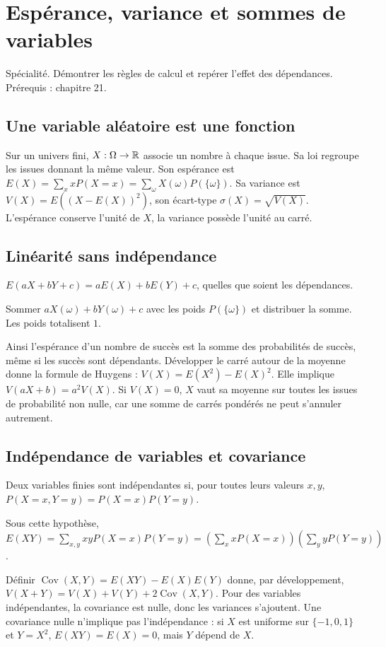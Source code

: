 \documentclass[../cours_tle.tex]{subfiles}
\begin{document}
\setcounter{chapter}{21}
\chapter{Espérance, variance et sommes de variables}
\label{ch:22}
\begin{objectif}
Spécialité. Démontrer les règles de calcul et repérer l'effet des dépendances. Prérequis : chapitre 21.
\end{objectif}
\section{Une variable aléatoire est une fonction}
Sur un univers fini, $X:\Omega\to\mathbb{R}$ associe un nombre à chaque issue. Sa loi regroupe les issues donnant la même valeur.
Son espérance est $E(X)=\sum_x xP(X=x)=\sum_{\omega}X(\omega)P(\{\omega\})$.
Sa variance est $V(X)=E((X-E(X))^2)$, son écart-type $\sigma(X)=\sqrt{V(X)}$.
L'espérance conserve l'unité de $X$, la variance possède l'unité au carré.
\section{Linéarité sans indépendance}
\begin{theoreme}
$E(aX+bY+c)=aE(X)+bE(Y)+c$, quelles que soient les dépendances.
\end{theoreme}
\begin{demonstration}
Sommer $aX(\omega)+bY(\omega)+c$ avec les poids $P(\{\omega\})$ et distribuer la somme. Les poids totalisent $1$.
\end{demonstration}
Ainsi l'espérance d'un nombre de succès est la somme des probabilités de succès, même si les succès sont dépendants.
Développer le carré autour de la moyenne donne la formule de Huygens :
$V(X)=E(X^2)-E(X)^2$. Elle implique $V(aX+b)=a^2V(X)$.
Si $V(X)=0$, $X$ vaut sa moyenne sur toutes les issues de probabilité non nulle, car une somme de carrés pondérés ne peut s'annuler autrement.
\section{Indépendance de variables et covariance}
Deux variables finies sont indépendantes si, pour toutes leurs valeurs $x,y$,
$P(X=x,Y=y)=P(X=x)P(Y=y)$.
\begin{demonstration}
Sous cette hypothèse,
$E(XY)=\sum_{x,y}xyP(X=x)P(Y=y)=(\sum_xxP(X=x))(\sum_yyP(Y=y))$.
\end{demonstration}
Définir $\operatorname{Cov}(X,Y)=E(XY)-E(X)E(Y)$ donne, par développement,
$V(X+Y)=V(X)+V(Y)+2\operatorname{Cov}(X,Y)$.
Pour des variables indépendantes, la covariance est nulle, donc les variances s'ajoutent. Une covariance nulle n'implique pas l'indépendance : si $X$ est uniforme sur $\{-1,0,1\}$ et $Y=X^2$, $E(XY)=E(X)=0$, mais $Y$ dépend de $X$.
\end{document}
